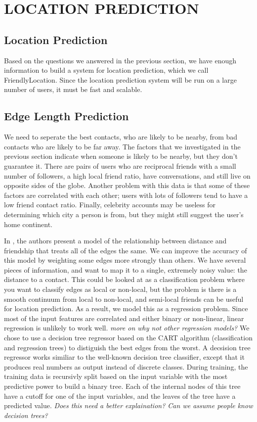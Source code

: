 \ifdefined\THESIS
    \chapter{\uppercase{Location Prediction}}
\else
    \section{Location Prediction}
\fi

Based on the questions we answered in the previous section, we have enough
information to build a system for location prediction, which we call
FriendlyLocation.
Since the location prediction system will be run on a large number of users,
it must be fast and scalable.

\section{Edge Length Prediction}

We need to seperate the best contacts, who are likely to be nearby, from
bad contacts who are likely to be far away.
%
The factors that we investigated in the previous section indicate when someone
is likely to be nearby, but they don't guarantee it.
%
There are pairs of users who are reciprocal friends with a small number of
followers, a high local friend ratio, have conversations, and still live on
opposite sides of the globe.
%
Another problem with this data is that some of these factors are correlated
with each other; users with lots of followers tend to have a low friend contact
ratio.
%
Finally, celebrity accounts may be useless for determining which city a person
is from, but they might still suggest the user's home continent.

In \cite{backstrom2010find}, the authors present a model of the relationship
between distance and friendship that treats all of the edges the same.
%
We can improve the accuracy of this model by weighting some edges more strongly
than others.
%
We have several pieces of information, and want to map it to a single, extremely
noisy value: the distance to a contact.
%
This could be looked at as a classification problem where you want to classify
edges as local or non-local, but the problem is there is a smooth continuum
from local to non-local, and semi-local friends can be useful for location
prediction.
%
As a result, we model this as a regression problem.
%
Since most of the input features are correlated and either binary or non-linear,
linear regression is unlikely to work well.
%
\emph{more on why not other regression models?}
%
We chose to use a decision tree regressor based on the CART algorithm
(classification and regression trees) to distiguish the best edges from the
worst.
%
A decsision tree regressor works similiar to the well-known decision tree
classifier, except that it produces real numbers as output instead of discrete
classes.
%
During training, the training data is recursivly split based on the input
variable with the most predictive power to build a binary tree.
%
Each of the internal nodes of this tree have a cutoff for one of the input
variables, and the leaves of the tree have a predicted value.
%
\emph{Does this need a better explaination? Can we assume people know decision
trees?}

